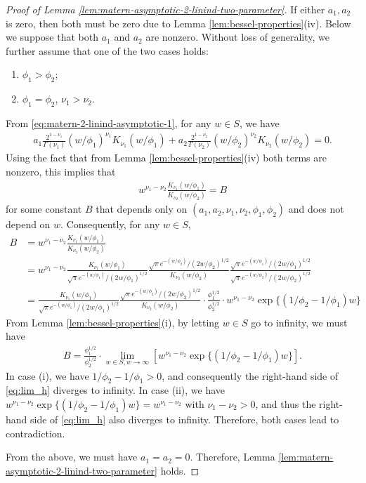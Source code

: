 \documentclass[11pt]{article}
\theoremstyle{definition}
\theoremstyle{remark}
\begin{document}
\begin{proof}[Proof of Lemma \ref{lem:matern-asymptotic-2-linind-two-parameter}]
If either $a_1, a_2$ is zero, then both must be zero due to Lemma \ref{lem:bessel-properties}(iv). 
Below we suppose that both $a_1$ and $a_2$ are nonzero.
Without loss of generality, we further assume that one of the two cases holds: 
\begin{enumerate}
    \item[(i)] $\phi_1 > \phi_2$; 
    \item[(ii)]  $\phi_1 = \phi_2$, $\nu_1 > \nu_2$. 
\end{enumerate}

From \eqref{eq:matern-2-linind-asymptotic-1}, for any $w\in S$,  we have 
\begin{align*}
    a_1 \frac{2^{1-\nu_1}}{\Gamma(\nu_1)} (w/\phi_1)^{\nu_1} K_{\nu_1}(w/\phi_1) + a_2 \frac{2^{1-\nu_2}}{\Gamma(\nu_2)} (w/\phi_2)^{\nu_2} K_{\nu_2}(w/\phi_2) =0. 
\end{align*}
Using the fact that from Lemma \ref{lem:bessel-properties}(iv)
both terms are nonzero, this implies that 
\begin{align*}
    w^{\nu_1 - \nu_2} \frac{K_{\nu_1}(w/\phi_1)}{K_{\nu_2}(w/\phi_2)} = B
\end{align*}
for some constant $B$ that depends only on $(a_1, a_2, \nu_1, \nu_2, \phi_1, \phi_2)$ and does not depend on $w$. 
Consequently, for any $w\in S$, 
\begin{align*}
    B & = w^{\nu_1 - \nu_2} \frac{K_{\nu_1}(w/\phi_1)}{K_{\nu_2}(w/\phi_2)} \\
    &= w^{\nu_1 - \nu_2} \frac{K_{\nu_1}(w/\phi_1)}{\sqrt{\pi} e^{-(w/\phi_1)}/(2w/\phi_1)^{1/2}}
    \frac{\sqrt{\pi} e^{-(w/\phi_2)}/(2w/\phi_2)^{1/2}}{K_{\nu_2}(w/\phi_2)}
    \frac{\sqrt{\pi} e^{-(w/\phi_1)}/(2w/\phi_1)^{1/2}}{\sqrt{\pi} e^{-(w/\phi_2)}/(2w/\phi_2)^{1/2}}\\
    & =  \frac{K_{\nu_1}(w/\phi_1)}{\sqrt{\pi} e^{-(w/\phi_1)}/(2w/\phi_1)^{1/2}}
    \frac{\sqrt{\pi} e^{-(w/\phi_2)}/(2w/\phi_2)^{1/2}}{K_{\nu_2}(w/\phi_2)}
    \cdot
    \frac{\phi_1^{1/2}}{\phi_2^{1/2}}
    \cdot 
    w^{\nu_1 - \nu_2}
    \exp\big\{(1/\phi_2 - 1/\phi_1)w\big\} 
\end{align*}
From Lemma \ref{lem:bessel-properties}(i), by letting $w\in S$ go to infinity, we must have  
\begin{align}\label{eq:lim_h}
    B = \frac{\phi_1^{1/2}}{\phi_2^{1/2}} \cdot \lim_{w\in S, w\rightarrow \infty} 
    \left[ w^{\nu_1 - \nu_2}
    \exp\big\{(1/\phi_2 - 1/\phi_1)w\big\} \right]. 
\end{align}
In case (i), we have $1/\phi_2 - 1/\phi_1>0$, and consequently the right-hand side of \eqref{eq:lim_h} diverges to infinity. 
In case (ii), we have $w^{\nu_1 - \nu_2}
    \exp\{(1/\phi_2 - 1/\phi_1)w\} = w^{\nu_1 - \nu_2}$ with $\nu_1 - \nu_2>0$, 
and thus the right-hand side of \eqref{eq:lim_h} also diverges to infinity. 
Therefore, both cases lead to contradiction. 

From the above, we must have $a_1=a_2=0$. Therefore, Lemma \ref{lem:matern-asymptotic-2-linind-two-parameter} holds.
\end{proof}
\end{document}
